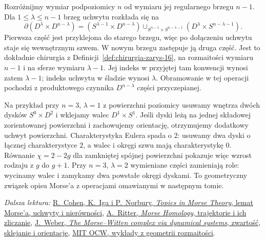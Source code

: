 \begin{przyklad}
\label{prz:morse-poziomica-chirurgia-22}
Rozróżnijmy wymiar podpoziomicy $n$ od wymiaru
jej regularnego brzegu $n-1$.
Dla $1\leq\lambda\leq n-1$ brzeg uchwytu rozkłada się na
\[
 \partial(D^\lambda\times D^{n-\lambda})
 =(S^{\lambda-1}\times D^{n-\lambda})
  \cup_{S^{\lambda-1}\times S^{n-\lambda-1}}
   (D^\lambda\times S^{n-\lambda-1}).
\]
Pierwsza część jest przyklejona do starego brzegu,
więc po dołączeniu uchwytu staje się wewnętrznym szwem.
W nowym brzegu zastępuje ją druga część.
Jest to dokładnie chirurgia z
Definicji~\ref{def:chirurgia-zarys-16},
na rozmaitości wymiaru $n-1$ i na sferze wymiaru $\lambda-1$.
Jej indeks w przyjętej tam konwencji wynosi zatem $\lambda-1$;
indeks uchwytu w śladzie wynosi $\lambda$.
Obramowanie w tej operacji pochodzi z produktowego
czynnika $D^{n-\lambda}$ części przyczepianej.

Na przykład przy $n=3$, $\lambda=1$ z powierzchni poziomicy
usuwamy wnętrza dwóch dysków $S^0\times D^2$
i wklejamy walec $D^1\times S^1$.
Jeśli dyski leżą na jednej składowej zorientowanej powierzchni
i zachowujemy orientację, otrzymujemy dodatkowy uchwyt powierzchni.
Charakterystyka Eulera spada o $2$: usuwamy dwa dyski
o łącznej charakterystyce $2$, a walec i okręgi szwu mają
charakterystykę $0$. Równanie $\chi=2-2g$ dla zamkniętej
spójnej powierzchni pokazuje więc wzrost rodzaju z $g$ do $g+1$.
Przy $n=3$, $\lambda=2$ wymieniane części zamieniają role:
wycinamy walec i zamykamy dwa powstałe okręgi dyskami.
To geometryczny związek opisu Morse'a z operacjami
omawianymi w następnym tomie.
\end{przyklad}

\par\smallskip
{\footnotesize\noindent\emph{Dalsza lektura:}
\href{https://math.stanford.edu/~ralph/morsecourse/biglectures.pdf}{R.\ Cohen, K.\ Iga i P.\ Norbury, \emph{Topics in Morse Theory}, lemat Morse'a, uchwyty i nierówności},
\href{https://people.maths.ox.ac.uk/ritter/morse-cambridge/full.pdf}{A.\ Ritter, \emph{Morse Homology}, trajektorie i ich zliczanie},
\href{https://arxiv.org/pdf/math/0411465}{J.\ Weber, \emph{The Morse--Witten complex via dynamical systems}, zwartość, sklejanie i orientacje},
\href{https://ocw.mit.edu/courses/18-965-geometry-of-manifolds-fall-2004/pages/lecture-notes/}{MIT OCW, wykłady z geometrii rozmaitości}.\par}
